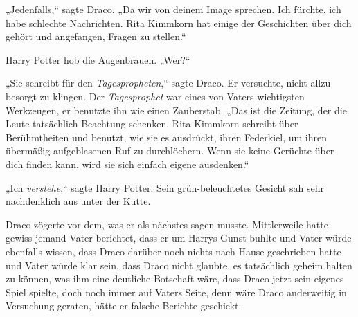 „Jedenfalls,“ sagte Draco. „Da wir von deinem Image sprechen. Ich fürchte, ich habe schlechte Nachrichten. Rita Kimmkorn hat einige der Geschichten über dich gehört und angefangen, Fragen zu stellen.“

Harry Potter hob die Augenbrauen. „Wer?“

„Sie schreibt für den \emph{Tagespropheten},“ sagte Draco. Er versuchte, nicht allzu besorgt zu klingen. Der \emph{Tagesprophet} war eines von Vaters wichtigsten Werkzeugen, er benutzte ihn wie einen Zauberstab. „Das ist die Zeitung, der die Leute tatsächlich Beachtung schenken. Rita Kimmkorn schreibt über Berühmtheiten und benutzt, wie sie es ausdrückt, ihren Federkiel, um ihren übermäßig aufgeblasenen Ruf zu durchlöchern. Wenn sie keine Gerüchte über dich finden kann, wird sie sich einfach eigene ausdenken.“

„Ich \emph{verstehe},“ sagte Harry Potter. Sein grün-beleuchtetes Gesicht sah sehr nachdenklich aus unter der Kutte.

Draco zögerte vor dem, was er als nächstes sagen musste. Mittlerweile hatte gewiss jemand Vater berichtet, dass er um Harrys Gunst buhlte und Vater würde ebenfalls wissen, dass Draco darüber noch nichts nach Hause geschrieben hatte und Vater würde klar sein, dass Draco nicht glaubte, es tatsächlich geheim halten zu können, was ihm eine deutliche Botschaft wäre, dass Draco jetzt sein eigenes Spiel spielte, doch noch immer auf Vaters Seite, denn wäre Draco anderweitig in Versuchung geraten, hätte er falsche Berichte geschickt.

